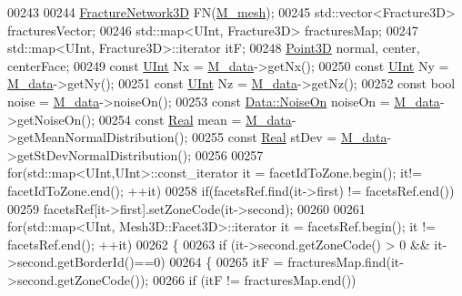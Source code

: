 \begin{DoxyCode}
00243 
00244     \hyperlink{classFVCode3D_1_1FractureNetwork3D}{FractureNetwork3D} FN(\hyperlink{classFVCode3D_1_1CartesianGrid_a40c64e663b3d2de02b852403c75495fb}{M\_mesh});
00245     std::vector<Fracture3D> fracturesVector;
00246     std::map<UInt, Fracture3D> fracturesMap;
00247     std::map<UInt, Fracture3D>::iterator itF;
00248     \hyperlink{classFVCode3D_1_1Point3D}{Point3D} normal, center, centerFace;
00249     \textcolor{keyword}{const} \hyperlink{namespaceFVCode3D_a4bf7e328c75d0fd504050d040ebe9eda}{UInt} Nx = \hyperlink{classFVCode3D_1_1CartesianGrid_a8548798ae1d2a011869ed314a1ebb8f3}{M\_data}->getNx();
00250     \textcolor{keyword}{const} \hyperlink{namespaceFVCode3D_a4bf7e328c75d0fd504050d040ebe9eda}{UInt} Ny = \hyperlink{classFVCode3D_1_1CartesianGrid_a8548798ae1d2a011869ed314a1ebb8f3}{M\_data}->getNy();
00251     \textcolor{keyword}{const} \hyperlink{namespaceFVCode3D_a4bf7e328c75d0fd504050d040ebe9eda}{UInt} Nz = \hyperlink{classFVCode3D_1_1CartesianGrid_a8548798ae1d2a011869ed314a1ebb8f3}{M\_data}->getNz();
00252     \textcolor{keyword}{const} \textcolor{keywordtype}{bool} noise = \hyperlink{classFVCode3D_1_1CartesianGrid_a8548798ae1d2a011869ed314a1ebb8f3}{M\_data}->noiseOn();
00253     \textcolor{keyword}{const} \hyperlink{classFVCode3D_1_1Data_a983fdc14aa355a7c9fd614b9655a3552}{Data::NoiseOn} noiseOn = \hyperlink{classFVCode3D_1_1CartesianGrid_a8548798ae1d2a011869ed314a1ebb8f3}{M\_data}->getNoiseOn();
00254     \textcolor{keyword}{const} \hyperlink{namespaceFVCode3D_a40c1f5588a248569d80aa5f867080e83}{Real} mean = \hyperlink{classFVCode3D_1_1CartesianGrid_a8548798ae1d2a011869ed314a1ebb8f3}{M\_data}->getMeanNormalDistribution();
00255     \textcolor{keyword}{const} \hyperlink{namespaceFVCode3D_a40c1f5588a248569d80aa5f867080e83}{Real} stDev = \hyperlink{classFVCode3D_1_1CartesianGrid_a8548798ae1d2a011869ed314a1ebb8f3}{M\_data}->getStDevNormalDistribution();
00256 
00257     \textcolor{keywordflow}{for}(std::map<UInt,UInt>::const\_iterator it = facetIdToZone.begin(); it!= facetIdToZone.end(); ++it)
00258         \textcolor{keywordflow}{if}(facetsRef.find(it->first) != facetsRef.end())
00259             facetsRef[it->first].setZoneCode(it->second);
00260 
00261     \textcolor{keywordflow}{for}(std::map<UInt, Mesh3D::Facet3D>::iterator it = facetsRef.begin(); it != facetsRef.end(); ++it)
00262     \{
00263         \textcolor{keywordflow}{if} (it->second.getZoneCode() > 0 && it->second.getBorderId()==0)
00264         \{
00265             itF = fracturesMap.find(it->second.getZoneCode());
00266             \textcolor{keywordflow}{if} (itF != fracturesMap.end())

\end{DoxyCode}
